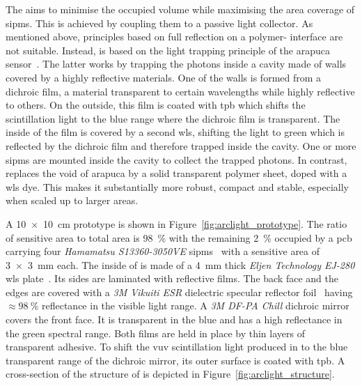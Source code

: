 The \AL{} aims to minimise the occupied volume while maximising the area coverage of \glspl{sipm}.
This is achieved by coupling them to a passive light collector.
As mentioned above, principles based on full reflection on a polymer-\lar{} interface are not suitable.
Instead, \AL{} is based on the light trapping principle of the \gls{arapuca} sensor~\cite{arapuca}.
The latter works by trapping the photons inside a cavity made of walls covered by a highly reflective materials.
One of the walls is formed from a dichroic film, a material transparent to certain wavelengths while highly reflective to others.
On the outside, this film is coated with \gls{tpb} which shifts the \lar{} scintillation light to the blue range where the dichroic film is transparent.
The inside of the film is covered by a second \gls{wls}, shifting the light to green which is reflected by the dichroic film and therefore trapped inside the cavity.
One or more \glspl{sipm} are mounted inside the cavity to collect the trapped photons.
In contrast, \AL{} replaces the void of \gls{arapuca} by a solid transparent polymer sheet, doped with a \gls{wls} dye.
This makes it substantially more robust, compact and stable, especially when scaled up to larger areas.

A \SI{10 x 10}{\centi\metre} \AL{} prototype is shown in Figure~\ref{fig:arclight_prototype}.
The ratio of sensitive area to total area is \SI{98}{\percent} with the remaining \SI{2}{\percent} occupied by a \gls{pcb} carrying four \emph{Hamamatsu S13360-3050VE} \glspl{sipm}~\cite{arclight_sipm} with a sensitive area of \SI{3 x 3}{\milli\metre} each.
The inside of \AL{} is made of a \SI{4}{\milli\metre} thick \emph{Eljen Technology EJ-280} \gls{wls} plate~\cite{arclight_wls}.
Its sides are laminated with reflective films.
The back face and the edges are covered with a \emph{3M Vikuiti ESR} dielectric specular reflector foil~\cite{arclight_esr} having $\approx \SI{98}{\percent}$ reflectance in the visible light range.
A \emph{3M DF-PA Chill} dichroic mirror~\cite{arclight_dichroic} covers the front face.
It is transparent in the blue and has a high reflectance in the green spectral range.
Both films are held in place by thin layers of transparent adhesive.
To shift the \gls{vuv} scintillation light produced in \lar{} to the blue transparent range of the dichroic mirror, its outer surface is coated with \gls{tpb}.
A cross-section of the structure of \AL{} is depicted in Figure~\ref{fig:arclight_structure}.

